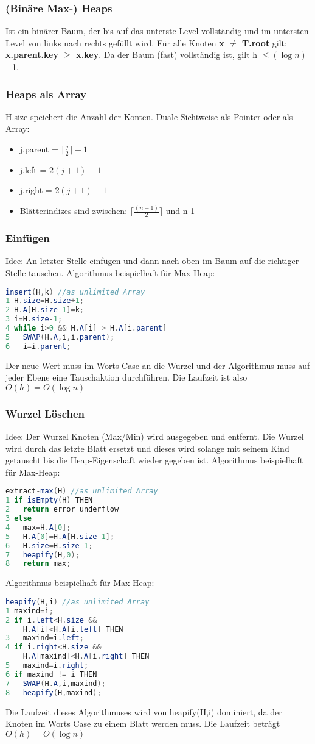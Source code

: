 \documentclass[jou,apacite]{apa6}
\begin{document}
\subsubsection{(Binäre Max-) Heaps}
Ist ein binärer Baum, der bis auf das unterste Level vollständig und im untersten Level von links nach rechts gefüllt wird. Für alle Knoten {\bfseries x $\neq$ T.root} gilt: {\bfseries x.parent.key $\geq$ x.key}. Da der Baum (fast) vollständig ist, gilt  h $\leq (\log n)$+1.
\subsubsection{Heaps als Array}
H.size speichert die Anzahl der Konten.
Duale Sichtweise als Pointer oder als Array:
\begin{itemize}
    \item j.parent = $\lceil{}\frac{j}{2}\rceil -1$
    \item j.left = $2(j+1) - 1$
    \item j.right = $2(j+1) -1$
    \item Blätterindizes sind zwischen: $\lceil{}\frac{(n-1)}{2}\rceil$ und n-1
\end{itemize}

\subsubsection{Einfügen}
Idee: An letzter Stelle einfügen und dann nach oben im Baum auf die richtiger Stelle tauschen.
Algorithmus beispielhaft für Max-Heap:
\begin{lstlisting}[language=java]
insert(H,k) //as unlimited Array
1 H.size=H.size+1;
2 H.A[H.size-1]=k;
3 i=H.size-1;
4 while i>0 && H.A[i] > H.A[i.parent]
5   SWAP(H.A,i,i.parent);
6   i=i.parent;
\end{lstlisting}
Der neue Wert muss im Worts Case an die Wurzel und der Algorithmus muss auf jeder Ebene eine Tauschaktion durchführen. Die Laufzeit ist also $O(h) = O(\log n)$ 
\subsubsection{Wurzel Löschen}
Idee: Der Wurzel Knoten (Max/Min) wird ausgegeben und entfernt. Die Wurzel wird durch das letzte Blatt ersetzt und dieses wird solange mit seinem Kind getauscht bis die Heap-Eigenschaft wieder gegeben ist. 
Algorithmus beispielhaft für Max-Heap:
\begin{lstlisting}[language=java]
extract-max(H) //as unlimited Array
1 if isEmpty(H) THEN
2   return error underflow
3 else
4   max=H.A[0];
5   H.A[0]=H.A[H.size-1];
6   H.size=H.size-1;
7   heapify(H,0);
8   return max;
\end{lstlisting}
Algorithmus beispielhaft für Max-Heap:
\begin{lstlisting}[language=java]
heapify(H,i) //as unlimited Array
1 maxind=i;
2 if i.left<H.size && 
    H.A[i]<H.A[i.left] THEN
3   maxind=i.left;
4 if i.right<H.size && 
    H.A[maxind]<H.A[i.right] THEN
5   maxind=i.right;
6 if maxind != i THEN
7   SWAP(H.A,i,maxind);
8   heapify(H,maxind);
\end{lstlisting}
Die Laufzeit dieses Algorithmuses wird von heapify(H,i) dominiert, da der Knoten im Worts Case zu einem Blatt werden muss. Die Laufzeit beträgt $O(h) = O(\log n)$
\end{document}

